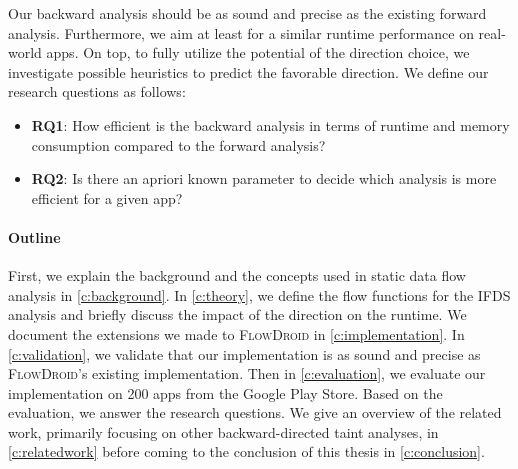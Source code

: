 \documentclass[../draft.tex]{subfiles}
\begin{document}
    Our backward analysis should be as sound and precise as the existing forward analysis.
    Furthermore, we aim at least for a similar runtime performance on real-world apps.
    On top, to fully utilize the potential of the direction choice, we investigate possible heuristics to predict the favorable direction. 
    We define our research questions as follows:   
    \begin{itemize}[leftmargin=*]
        \item[] \textbf{RQ1}: How efficient is the backward analysis in terms of runtime and memory consumption compared to the forward analysis?
        \item[] \textbf{RQ2}: Is there an apriori known parameter to decide which analysis is more efficient for a given app? 
    \end{itemize}

    \paragraph{Outline}
    First, we explain the background and the concepts used in static data flow analysis in \autoref{c:background}.
    In \autoref{c:theory}, we define the flow functions for the IFDS analysis and briefly discuss the impact of the direction on the runtime.
    We document the extensions we made to \textsc{FlowDroid} in \autoref{c:implementation}.
    In \autoref{c:validation}, we validate that our implementation is as sound and precise as \textsc{FlowDroid}'s existing implementation.
    Then in \autoref{c:evaluation}, we evaluate our implementation on 200 apps from the Google Play Store. Based on the evaluation, we answer the research questions.
    We give an overview of the related work, primarily focusing on other backward-directed taint analyses, in \autoref{c:relatedwork} before coming to the conclusion of this thesis in \autoref{c:conclusion}.
\end{document}
